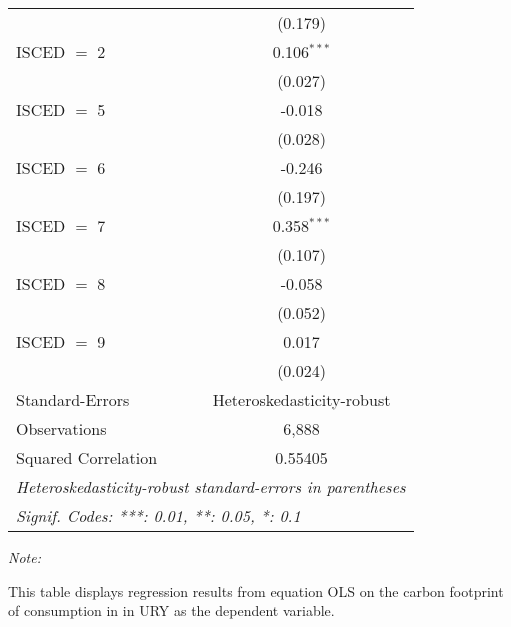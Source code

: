 \begin{table}[htbp!]
\begin{adjustbox}{width = 1\textwidth, max height = 0.95\textheight, center}
\begin{threeparttable}[b]
\begin{tabular}{lc}
                                & (0.179)\\   
            ISCED $=$ 2         & 0.106$^{***}$\\   
                                & (0.027)\\   
            ISCED $=$ 5         & -0.018\\   
                                & (0.028)\\   
            ISCED $=$ 6         & -0.246\\   
                                & (0.197)\\   
            ISCED $=$ 7         & 0.358$^{***}$\\   
                                & (0.107)\\   
            ISCED $=$ 8         & -0.058\\   
                                & (0.052)\\   
            ISCED $=$ 9         & 0.017\\   
                                & (0.024)\\   
            \midrule 
            Standard-Errors     & Heteroskedasticity-robust \\   
            Observations        & 6,888\\  
            Squared Correlation & 0.55405\\  
            \midrule \midrule
            \multicolumn{2}{l}{\emph{Heteroskedasticity-robust standard-errors in parentheses}}\\
            \multicolumn{2}{l}{\emph{Signif. Codes: ***: 0.01, **: 0.05, *: 0.1}}\\
         \end{tabular}
         
         \begin{tablenotes}\item \medskip \textit{Note:}
            \item This table displays regression results from equation OLS on the carbon footprint of consumption in  in URY as the dependent variable.  
         \end{tablenotes}
      \end{threeparttable}
   \end{adjustbox}
\end{table}


